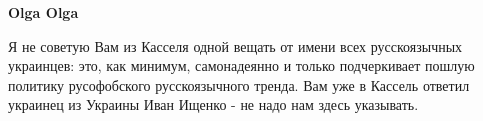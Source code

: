 \begin{itemize}
\begin{itemize}
 
\textbf{Olga Olga} 

Я не советую Вам из Касселя одной вещать от имени всех русскоязычных украинцев:
это, как минимум, самонадеянно и только подчеркивает пошлую политику
русофобского русскоязычного тренда. Вам уже в Кассель ответил украинец из
Украины Иван Ищенко - не надо нам здесь указывать.
\end{itemize}

\end{itemize}

